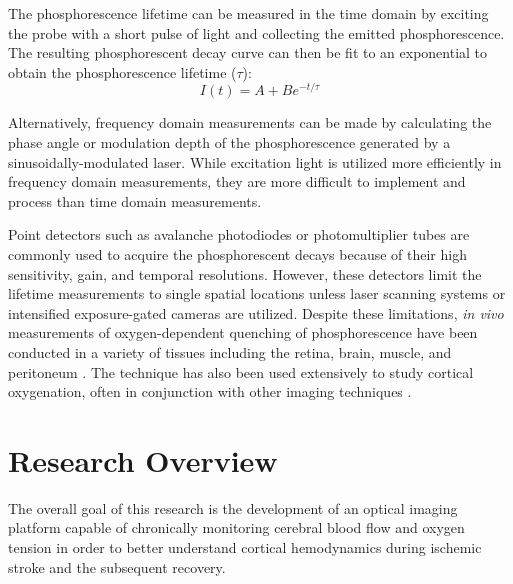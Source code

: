 The phosphorescence lifetime can be measured in the time domain by exciting the probe with a short pulse of light and collecting the emitted phosphorescence. The resulting phosphorescent decay curve can then be fit to an exponential to obtain the phosphorescence lifetime ($\tau$):
%
\begin{equation}
    \label{eq:exponential_decay}
    I(t) = A + Be^{-t / \tau}
\end{equation}

Alternatively, frequency domain measurements can be made by calculating the phase angle or modulation depth of the phosphorescence generated by a sinusoidally-modulated laser. While excitation light is utilized more efficiently in frequency domain measurements, they are more difficult to implement and process than time domain measurements.

Point detectors such as avalanche photodiodes or photomultiplier tubes are commonly used to acquire the phosphorescent decays because of their high sensitivity, gain, and temporal resolutions. However, these detectors limit the lifetime measurements to single spatial locations unless laser scanning systems \cite{Yaseen:2009ep, Kazmi:2013ey} or intensified exposure-gated cameras \cite{Shonat:2003ia, Sakadzic:2009jo} are utilized. Despite these limitations, \textit{in vivo} measurements of oxygen-dependent quenching of phosphorescence have been conducted in a variety of tissues including the retina, brain, muscle, and peritoneum \cite{Vovenko:1999be}. The technique has also been used extensively to study cortical oxygenation, often in conjunction with other imaging techniques \cite{Yu:2013fd, Devor:2014ke}.



\section{Research Overview}

The overall goal of this research is the development of an optical imaging platform capable of chronically monitoring cerebral blood flow and oxygen tension in order to better understand cortical hemodynamics during ischemic stroke and the subsequent recovery.


